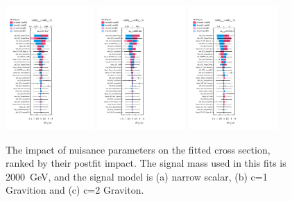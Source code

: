 \begin{figure}[htbp!]
\begin{center}
\includegraphics[width=0.3\textwidth,angle=-90]{figures/boosted/results/ranking_okt18_s_2000.pdf} 
\includegraphics[width=0.3\textwidth,angle=-90]{figures/boosted/results/ranking_okt18_g10_2000.pdf} 
\includegraphics[width=0.3\textwidth,angle=-90]{figures/boosted/results/ranking_okt18_g20_2000.pdf} 
\caption{The impact of nuisance parameters on the fitted cross section, ranked by their postfit impact. The signal mass used in this fits is 2000~GeV, and the signal model is (a) narrow scalar, (b) c=1 Gravition and (c) c=2 Graviton.}
\label{fig:ranking2000}
\end{center}
\end{figure}
